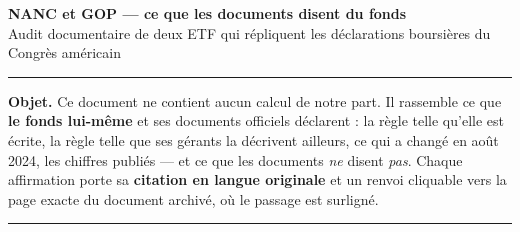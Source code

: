 \documentclass[9pt,a4paper]{extarticle}
\begin{document}
\begin{center}
{\large\bfseries NANC et GOP --- ce que les documents disent du fonds}\\[0.5mm]
{\small Audit documentaire de deux ETF qui répliquent les déclarations boursières du Congrès américain}
\end{center}
\vspace{0.4mm}\hrule\vspace{0.8mm}
{\footnotesize
\textbf{Objet.} Ce document ne contient aucun calcul de notre part. Il rassemble ce que \textbf{le fonds lui-même}
et ses documents officiels déclarent : la règle telle qu'elle est écrite, la règle telle que ses gérants la
décrivent ailleurs, ce qui a changé en août 2024, les chiffres publiés --- et ce que les documents \emph{ne}
disent \emph{pas}. Chaque affirmation porte sa \textbf{citation en langue originale} et un renvoi cliquable vers
la page exacte du document archivé, où le passage est surligné.}
\vspace{0.8mm}\hrule\vspace{1.2mm}
\end{document}
